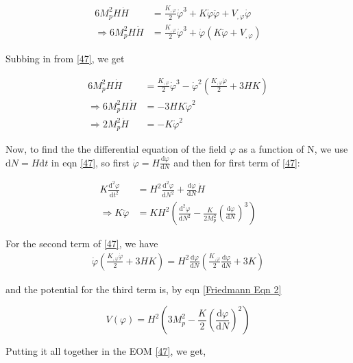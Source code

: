 \documentclass{article}
\begin{document}
\begin{align}   
     6 M_p^2H \dot{H} &= \frac{K_{,\varphi}}{2} \dot{\varphi}^3 + K \dot{\varphi} \ddot{\varphi} + V_{,\varphi} \dot{\varphi} \nonumber \\
     \Rightarrow 6 M_p^2H \dot{H} &= \frac{K_{,\varphi}}{2} \dot{\varphi}^3 + \dot{\varphi} (K  \ddot{\varphi} + V_{,\varphi}) 
\end{align}

Subbing in from \ref{47}, we get

\begin{align}
    6 M_p^2H \dot{H} &= \frac{K_{,\varphi}}{2} \dot{\varphi}^3 - \dot{\varphi}^2 \left(\frac{K_{,\varphi} \dot{\varphi}}{2} + 3H K \right) \nonumber \\
    \Rightarrow 6 M_p^2H \dot{H} &= - 3H K \dot{\varphi}^2   \nonumber \\ 
    \Rightarrow 2 M_p^2 \dot{H} &= -  K \dot{\varphi}^2
\end{align}

Now, to find the the differential equation of the field $\varphi$ as a function of N, we use $\text{d}N = H \text{d}t$ in eqn \ref{47}, so first $ \dot{\varphi} = H \frac{\text{d}\varphi}{\text{d}N}$ and then for first term of \ref{47}:

\begin{align} \label{52}
    K \frac{\text{d}^2\varphi}{\text{d}t^2} &= H^2 \frac{\text{d}^2\varphi}{\text{d}N^2} + \frac{\text{d}\varphi}{\text{d}N}\dot{H} \nonumber \\
    \Rightarrow K \ddot{\varphi} &= K H^2 \left( \frac{\text{d}^2\varphi}{\text{d}N^2} - \frac{K}{2M_p^2} \left(\frac{\text{d}\varphi}{\text{d}N} \right)^3 \right) 
\end{align}

For the second term of \ref{47}, we have
\begin{align}
    \dot{\varphi} \left(\frac{K_{,\varphi} \dot{\varphi}}{2} + 3H K \right) = H^2 \frac{\text{d}\varphi}{\text{d}N} \left(\frac{K_{,\varphi}}{2} \frac{\text{d}\varphi}{\text{d}N}+ 3 K \right)
\end{align}

and the potential for the third term is, by eqn \ref{Friedmann Eqn 2}

\begin{equation}
    V(\varphi) = H^2 \left( 3 M_p^2 - \frac{K}{2} \left(\frac{\text{d}\varphi}{\text{d}N} \right)^2 \right)
\end{equation}

Putting it all together in the EOM \ref{47}, we get, 
\end{document}
